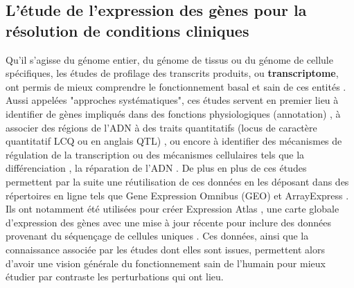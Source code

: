 

\subsection{L'étude de l'expression des gènes pour la résolution de conditions cliniques}

Qu'il s'agisse du génome entier, du génome de tissus ou du génome de cellule spécifiques, les études de profilage des transcrits produits, ou \textbf{transcriptome}, ont permis de mieux comprendre le fonctionnement basal et sain de ces entités \cite{Hughes2000, Cloonan2008Jul}. Aussi appelées "approches systématiques", ces études servent en premier lieu à identifier de gènes impliqués dans des fonctions physiologiques (annotation) \cite{Munji2019Nov}, à associer des régions de l'ADN à des traits quantitatifs (locus de caractère quantitatif LCQ ou en anglais QTL) \cite{Sarkar2019Apr}, ou encore à identifier des mécanismes de régulation de la transcription \cite{Segales2016Dec} ou des mécanismes cellulaires tels que la différenciation \cite{Godoy2018Jul}, la réparation de l'ADN \cite{Jividen2018Dec}. De plus en plus de ces études permettent par la suite une réutilisation de ces données en les déposant dans des répertoires en ligne tels que Gene Expression Omnibus (GEO) \cite{Barrett2013Jan} et ArrayExpress \cite{Athar2019Jan}. Ils ont notamment été utilisées pour créer Expression Atlas \cite{Lukk2010Apr}, une carte globale d'expression des gènes avec une mise à jour récente pour inclure des données provenant du séquençage de cellules uniques \cite{Papatheodorou2020Jan}. Ces données, ainsi que la connaissance associée par les études dont elles sont issues, permettent alors d'avoir une vision générale du fonctionnement sain de l'humain pour mieux étudier par contraste les perturbations qui ont lieu.

